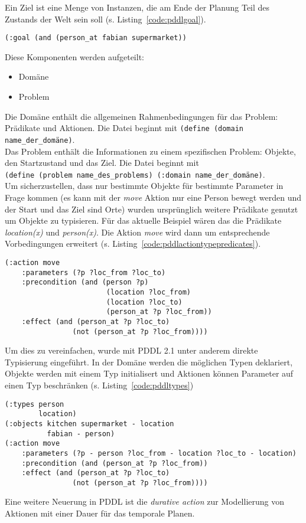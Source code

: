 Ein Ziel ist eine Menge von Instanzen, die am Ende der Planung Teil des Zustands der Welt sein soll (s. Listing~\ref{code:pddlgoal}).
\begin{lstlisting}[caption={Ziel in PDDL},language=pddl,label=code:pddlgoal]
(:goal (and (person_at fabian supermarket))
\end{lstlisting}
Diese Komponenten werden aufgeteilt:
\begin{itemize}
    \item Domäne
    \item Problem
\end{itemize}
Die Domäne enthält die allgemeinen Rahmenbedingungen für das Problem: Prädikate und Aktionen.
Die Datei beginnt mit \verb|(define (domain name_der_domäne)|.\\
Das Problem enthält die Informationen zu einem spezifischen Problem: Objekte, den Startzustand und das Ziel.
Die Datei beginnt mit\\\verb|(define (problem name_des_problems) (:domain name_der_domäne)|.\\
Um sicherzustellen, dass nur bestimmte Objekte für bestimmte Parameter in Frage kommen (es kann mit der \emph{move} Aktion nur eine Person bewegt werden und der Start und das Ziel sind Orte) wurden ursprünglich weitere Prädikate genutzt um Objekte zu typisieren.
Für das aktuelle Beispiel wären das die Prädikate \emph{location(x)} und \emph{person(x)}.
Die Aktion \emph{move} wird dann um entsprechende Vorbedingungen erweitert (s. Listing~\ref{code:pddlactiontypepredicates}).
\begin{lstlisting}[caption={Move Aktion mit Prädikaten zur Typisierung},language=pddl,label=code:pddlactiontypepredicates]
(:action move
    :parameters (?p ?loc_from ?loc_to)
    :precondition (and (person ?p)
                        (location ?loc_from)
                        (location ?loc_to)
                        (person_at ?p ?loc_from))
    :effect (and (person_at ?p ?loc_to)
                (not (person_at ?p ?loc_from))))
\end{lstlisting}
Um dies zu vereinfachen, wurde mit \ac{PDDL} 2.1 unter anderem direkte Typisierung eingeführt.
In der Domäne werden die möglichen Typen deklariert, Objekte werden mit einem Typ initialisert und Aktionen können Parameter auf einen Typ beschränken (s. Listing~\ref{code:pddltypes})
\begin{lstlisting}[caption={Typ Unterstützung in \ac{PDDL} 2.1},language=pddl,label=code:pddltypes]
(:types person
        location)
(:objects kitchen supermarket - location
          fabian - person)
(:action move
    :parameters (?p - person ?loc_from - location ?loc_to - location)
    :precondition (and (person_at ?p ?loc_from))
    :effect (and (person_at ?p ?loc_to)
                (not (person_at ?p ?loc_from))))
\end{lstlisting}
Eine weitere Neuerung in \ac{PDDL} ist die \emph{durative action} zur Modellierung von Aktionen mit einer Dauer für das temporale Planen.\\

